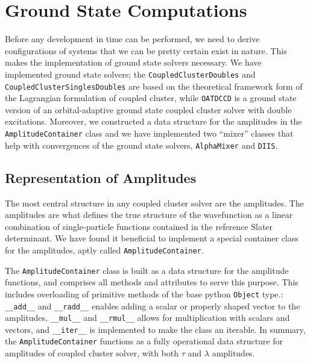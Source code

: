 \section{Ground State Computations}

    Before any development in time can be performed, we need to derive configurations 
    of systems that 
    we can be pretty certain exist in nature. This makes the implementation of ground 
    state solvers necessary. We have implemented ground state solvers; the
    \lstinline{CoupledClusterDoubles} and \lstinline{CoupledClusterSinglesDoubles} 
    are based on the theoretical framework form of the Lagrangian formulation of coupled 
    cluster, while \lstinline{OATDCCD} is a ground state version of an orbital-adaptive 
    ground state coupled cluster solver with double excitations. Moreover, we constructed 
    a data structure for the amplitudes in the \lstinline{AmplitudeContainer} class and 
    we have implemented two ``mixer'' classes that help with convergences of the ground
    state solvers, \lstinline{AlphaMixer} and \lstinline{DIIS}.

    \subsection{Representation of Amplitudes}

    The most central structure in any coupled cluster solver are the amplitudes. The 
    amplitudes are what defines the true structure of the wavefunction as a linear 
    combination of single-particle functions contained in the reference Slater 
    determinant. We have found it beneficial to implement a special container 
    class for the amplitudes, aptly called \lstinline{AmplitudeContainer}.

    

    The \lstinline{AmplitudeContainer} class is built as a data structure for 
    the amplitude functions, and comprises all methods and attributes to serve this 
    purpose. This includes overloading of primitive methods of the base 
    python \lstinline{Object} type.: \lstinline{__add__} and \lstinline{__radd__}
    enables adding a scalar or properly shaped vector to the amplitudes, 
    \lstinline{__mul__} and \lstinline{__rmul__} allows for multiplication 
    with scalars and vectors, and \lstinline{__iter__} is implemented to make 
    the class an iterable. In summary, the \lstinline{AmplitudeContainer} 
    functions as a fully operational data structure for amplitudes of coupled 
    cluster solver, with both $\tau$ and $\lambda$ amplitudes.

